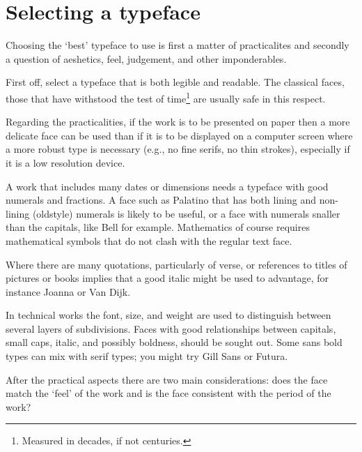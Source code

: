 \documentclass[10pt,letterpaper,extrafontsizes]{memoir}
\newcommand{\PWnote}[2]{}
\begin{document}
\PWnote{2009/04/26}{Added section on selecting a typeface}
\section{Selecting a typeface}

    Choosing the `best' typeface to use is first a matter of practicalites
and secondly a question of aeshetics, feel, judgement, and other 
imponderables.

    First off, 
select a typeface that is both legible and readable.
The classical faces, those that have withstood the test of 
time\footnote{Measured in decades, if not centuries.} are
usually safe in this respect.

   Regarding the practicalities, 
if the work is to be presented on paper then
a more delicate face can be used than if it is to be displayed on a computer
screen where a more robust type is necessary (e.g., no fine serifs, no 
thin strokes), especially if it is a low resolution device.

  A work that includes many dates or dimensions needs a typeface with good
numerals and fractions. A face such as Palatino
 that has both lining and non-lining (oldstyle)
numerals is likely to be useful, or a face with numerals snaller than the
capitals, like Bell for example. Mathematics of course requires mathematical
symbols that do not clash with the regular text face.

    Where there are many quotations, particularly of verse, or references 
to titles of pictures or books implies that a good italic might be used
to advantage, for instance Joanna or 
Van Dijk.

    In technical works the font, size, and weight are used to distinguish 
between several layers of subdivisions. Faces with good relationships between
capitals, small caps, italic, and possibly boldness, should be sought out.  
Some sans bold types can mix with serif types; you might try 
Gill Sans or Futura.



    After the practical aspects there are two main considerations: 
does the face match the `feel' of the work and is the face consistent 
with the period of the 
work? 
\end{document}
